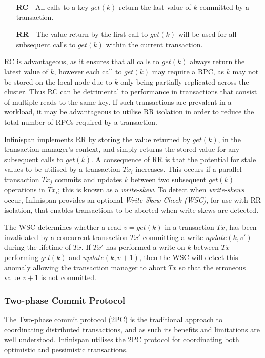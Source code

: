 	        \begin{itemize}
	            \item[\textbf{RC} -] All calls to a key $get(k)$ return the last value of $k$ committed by a transaction.  
	            \item[\textbf{RR} -] The value return by the first call to $get(k)$ will be used for all subsequent calls to $get(k)$ within the current transaction.
	        \end{itemize}   
	        
	        RC is advantageous, as it ensures that all calls to $get(k)$ always return the latest value of $k$, however each call to $get(k)$ may require a RPC, as $k$ may not be stored on the local node due to $k$ only being partially replicated across the cluster. Thus RC can be detrimental to performance in transactions that consist of multiple reads to the same key.  If such transactions are prevalent in a workload, it may be advantageous to utilise RR isolation in order to reduce the total number of RPCs required by a transaction.  
	        
	        Infinispan implements RR by storing the value returned by $get(k)$, in the transaction manager's context, and simply returns the stored value for any subsequent calls to $get(k)$.  A consequence of RR is that the potential for stale values to be utilised by a transaction $Tx_i$ increases.  This occurs if a parallel transaction $Tx_j$ commits and updates $k$ between two subsequent $get(k)$ operations in $Tx_i$; this is known as a \emph{write-skew}.  To detect when \emph{write-skews}\label{write-skew} occur, Infinispan provides an optional \emph{Write Skew Check (WSC)}, for use with RR isolation, that enables transactions to be aborted when write-skews are detected.  
	        
	        The WSC determines whether a read $v = get(k)$ in a transaction $Tx$, has been invalidated by a concurrent transaction $Tx'$ committing a write $update(k, v')$ during the lifetime of $Tx$.  If $Tx'$ has performed a write on $k$ between $Tx$ performing $get(k)$ and $update(k, v+1)$, then the WSC will detect this anomaly allowing the transaction manager to abort $Tx$ so that the erroneous value $v+1$ is not committed.  

        
	    \subsubsection{Two-phase Commit Protocol}
	       The Two-phase commit protocol (2PC)\citep{Bernstein:1996:PTP:261193} is the traditional approach to coordinating distributed transactions, and as such its benefits and limitations are well understood.  Infinispan utilises the 2PC protocol for coordinating both optimistic and pessimistic transactions.  
	       
